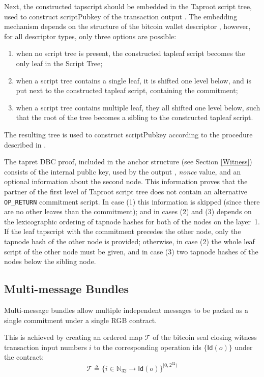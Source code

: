 \documentclass[9pt,oneside]{amsart}
\begin{document}
\begin{multicols}{2}
Next, the constructed tapscript should be embedded in the Taproot script tree,
used to construct \textsf{scriptPubkey} of the transaction output \cite{BIP341}.
The embedding mechanism depends on the structure of the bitcoin wallet descriptor \cite{BIP380},
however, for all descriptor types, only three options are possible:
\noindent
\begin{enumerate}
\item when no script tree is present,
    the constructed tapleaf script becomes the only leaf in the Script Tree;
\item when a script tree contains a single leaf, it is shifted one level below,
    and is put next to the constructed tapleaf script, containing the commitment;
\item when a script tree contains multiple leaf, they all shifted one level below,
    such that the root of the tree becomes a sibling to the constructed tapleaf script.
\end{enumerate}
\noindent
The resulting tree is used to construct \textsf{scriptPubkey}
according to the procedure described in \cite{BIP341}.

The tapret DBC proof, included in the anchor structure (see Section \ref{Witness})
consists of the internal public key, used by the output \cite{BIP341},
\emph{nonce} value, and an optional information about the second node.
This information proves that the partner of the first level of Taproot script tree
does not contain an alternative \verb|OP_RETURN| commitment script.
In case (1) this information is skipped (since there are no other leaves than the commitment);
and in cases (2) and (3) depends on the lexicographic ordering
of tapnode hashes \cite{BIP341} for both of the nodes on the layer~1.
If the leaf tapscript with the commitment precedes the other node,
only the tapnode hash of the other node is provided;
otherwise, in case (2) the whole leaf script of the other node must be given,
and in case (3) two tapnode hashes of the nodes below the sibling node.


\subsection{Multi-message Bundles}\label{MMB}

Multi-message bundles allow multiple independent messages
to be packed as a single commitment under a single RGB contract.

This is achieved by creating an ordered map $\mathcal{T}$ of
the bitcoin seal closing witness transaction input numbers $i$
to the corresponding operation ids $\{ \mathsf{Id}(o) \}$ under the contract:
\noindent
\begin{equation}
    \mathcal{T} \triangleq \{ i \in \mathbb{N}_{32} \rightarrow \mathsf{Id}(o) \}^{[0, 2^{32})}
\end{equation}


\end{multicols}
\end{document}

